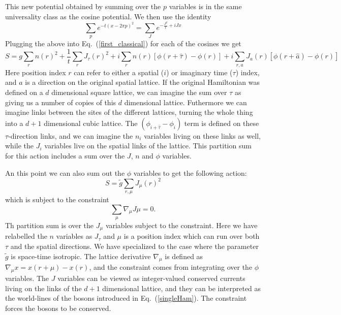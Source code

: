 This new potential obtained by summing over the $p$ variables is in the same universality class as the cosine potential. We then use the identity
\begin{equation}
\sum_p e^{-t(x-2\pi p)^2}=\sum_{J} e^{-\frac{J^2}{t}+iJ x}
\label{Villain2}
\end{equation}
Plugging the above into Eq.~(\ref{first_classical}) for each of the cosines we get
\begin{equation}
S=g\sum_{r} n(r)^2 + \frac{1}{t}\sum_r J_\tau(r)^2 + i\sum_r n(r) [\phi(r+\hat\tau)-\phi(r)] + i\sum_{r,a} J_{a}(r) [\phi(r+\hat a)-\phi(r)]
\end{equation}
Here position index $r$ can refer to either a spatial ($i$) or imaginary time ($\tau$) index, and $a$ is a direction on the original spatial lattice. If the original Hamiltonian was defined on a $d$ dimensional square lattice, we can imagine the sum over $\tau$ as giving us a number of copies of this $d$ dimensional lattice. Futhermore we can imagine links between the sites of the different lattices, turning the whole thing into a $d+1$ dimensional cubic lattice. The $(\phi_{i+\hat\tau}-\phi_i)$ term is defined on these $\tau$-direction links, and we can imagine the $n_i$ variables living on these links as well, while the $J_i$ variables live on the spatial links of the lattice. This partition sum for this action includes a sum over the $J$, $n$ and $\phi$ variables.

An this point we can also sum out the $\phi$ variables to get the following action:
\begin{equation}
S=\tilde g\sum_{r,\mu} J_\mu(r)^2
\label{singleJ}
\end{equation}
which is subject to the constraint 
\begin{equation}
\sum_\mu \nabla_\mu J\mu=0.
\label{constraint}
\end{equation}
Th partition sum is over the $J_\mu$ variables subject to the constraint. Here we have relabelled the $n$ variables as $J_\tau$ and $\mu$ is a position index which can run over both $\tau$ and the spatial directions. We have specialized to the case where the parameter $\tilde g$ is space-time isotropic. The lattice derivative $\nabla_\mu$ is defined as $\nabla_\mu x= x(r+\mu)-x(r)$, and the constraint comes from integrating over the $\phi$ variables. The $J$ variables can be viewed as integer-valued conserved currents living on the links of the $d+1$ dimensional lattice, and they can be interpreted as the world-lines of the bosons introduced in Eq.~(\ref{singleHam}). The constraint forces the bosons to be conserved.

